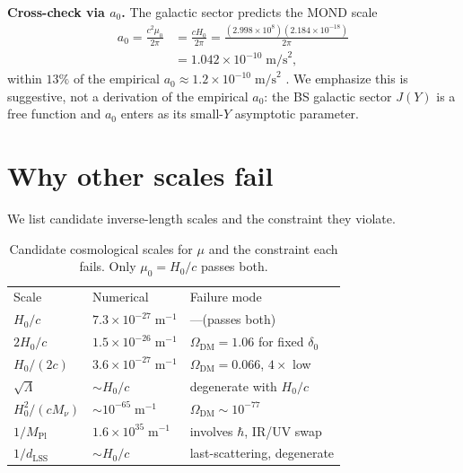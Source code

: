 \documentclass[prd,twocolumn,superscriptaddress,longbibliography,floatfix]{revtex4-2}
\newcommand{\Hzero}{H_{0}}
\newcommand{\muzero}{\mu_{0}}
\newcommand{\OmegaDM}{\Omega_{\mathrm{DM}}}
\newcommand{\MPl}{M_{\mathrm{Pl}}}
\begin{document}
\textbf{Cross-check via $a_{0}$.}  The galactic sector
predicts the MOND scale
\begin{align}
a_{0} = \frac{c^{2}\muzero}{2\pi}
&= \frac{c\Hzero}{2\pi}
= \frac{(2.998 \times 10^{8})(2.184 \times 10^{-18})}{2\pi}\nonumber\\
&= 1.042 \times 10^{-10}\;\mathrm{m/s}^{2},
\label{eq:a0_check}
\end{align}
within $13\%$ of the empirical
$a_{0} \approx 1.2 \times 10^{-10}\;\mathrm{m/s}^{2}$
\cite{Milgrom1983}.  We emphasize this is suggestive, not
a derivation of the empirical $a_{0}$: the BS galactic
sector $J(Y)$ is a free function and $a_{0}$ enters as
its small-$Y$ asymptotic parameter.

\section{Why other scales fail}
\label{sec:fails}

We list candidate inverse-length scales and the constraint
they violate.

\begin{table}[b]
\caption{\label{tab:scales}Candidate cosmological scales
for $\mu$ and the constraint each fails.  Only
$\muzero = \Hzero/c$ passes both.}
\begin{ruledtabular}
\begin{tabular}{lll}
Scale & Numerical & Failure mode \\
\colrule
$\Hzero/c$ & $7.3 \times 10^{-27}\;\mathrm{m}^{-1}$
  & ---\;(passes both) \\
$2\Hzero/c$ & $1.5 \times 10^{-26}\;\mathrm{m}^{-1}$
  & $\OmegaDM = 1.06$ for fixed $\delta_{0}$ \\
$\Hzero/(2c)$ & $3.6 \times 10^{-27}\;\mathrm{m}^{-1}$
  & $\OmegaDM = 0.066$, $4\times$ low \\
$\sqrt{\Lambda}$ & $\sim \Hzero/c$
  & degenerate with $\Hzero/c$ \\
$\Hzero^{2}/(cM_{\nu})$ & $\sim 10^{-65}\;\mathrm{m}^{-1}$
  & $\OmegaDM \sim 10^{-77}$ \\
$1/\MPl$ & $1.6 \times 10^{35}\;\mathrm{m}^{-1}$
  & involves $\hbar$, IR/UV swap \\
$1/d_{\mathrm{LSS}}$ & $\sim \Hzero/c$
  & last-scattering, degenerate \\
\end{tabular}
\end{ruledtabular}
\end{table}
\end{document}
